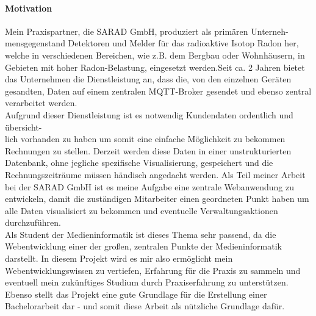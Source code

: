\documentclass[letterpaper,11pt,leqno]{article}
\begin{document}
\paragraph{Motivation}
Mein Praxispartner, die SARAD GmbH, produziert als primären Unterneh-\\mensgegenstand Detektoren und Melder für das radioaktive
Isotop Radon her,  welche in verschiedenen Bereichen, wie z.B. dem Bergbau oder Wohnhäusern, in Gebieten mit hoher Radon-Belastung,
eingesetzt werden.Seit ca. 2 Jahren bietet das Unternehmen die Dienstleistung an, dass die, von den einzelnen Geräten gesandten,
Daten auf einem zentralen MQTT-Broker gesendet und ebenso zentral verarbeitet werden.\\Aufgrund dieser Dienstleistung ist es
notwendig Kundendaten ordentlich und übersicht-\\lich vorhanden zu haben um somit eine einfache Möglichkeit zu bekommen Rechnungen
zu stellen. Derzeit werden diese Daten in einer unstrukturierten Datenbank, ohne jegliche spezifische Visualisierung, gespeichert
und die Rechnungszeiträume müssen händisch angedacht werden. Als Teil meiner Arbeit bei der SARAD GmbH ist es meine Aufgabe eine
zentrale Webanwendung zu entwickeln, damit die zuständigen Mitarbeiter einen geordneten Punkt haben um alle Daten visualisiert zu
bekommen und eventuelle Verwaltungsaktionen durchzuführen.\\Als Student der Medieninformatik ist dieses Thema sehr passend, da die
Webentwicklung einer der großen, zentralen Punkte der Medieninformatik darstellt. In diesem Projekt wird es mir also ermöglicht
mein Webentwicklungswissen zu vertiefen, Erfahrung für die Praxis zu sammeln und eventuell mein zukünftiges Studium durch
Praxiserfahrung zu unterstützen. Ebenso stellt das Projekt eine gute Grundlage für die Erstellung einer Bachelorarbeit dar - und
somit diese Arbeit als nützliche Grundlage dafür.
\end{document}
